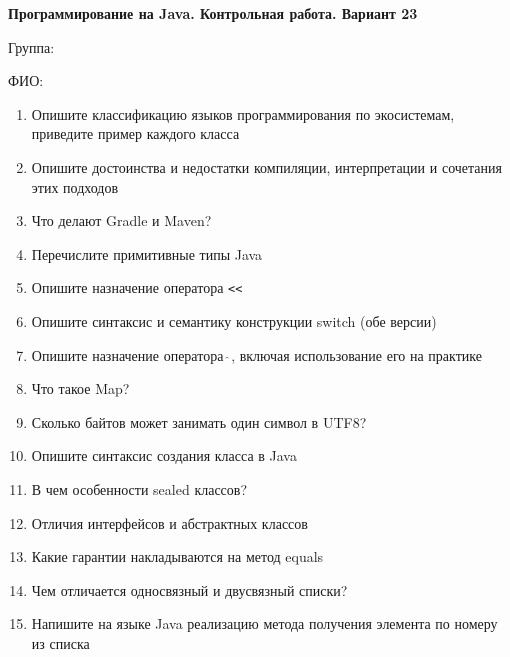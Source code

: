 \documentclass[12pt]{article}
\begin{document}
\newpage\begin{minipage}{\textwidth}
\textbf{Программирование на Java. Контрольная работа. Вариант 23}

Группа: \underline{\hspace{3cm}}

ФИО: \underline{\hspace{10cm}}

\begin{enumerate}
\item Опишите классификацию языков программирования по экосистемам, приведите пример каждого класса
\item Опишите достоинства и недостатки компиляции, интерпретации и сочетания этих подходов
\item Что делают Gradle и Maven?
\item Перечислите примитивные типы Java
\item Опишите назначение оператора \verb|<<|
\item Опишите синтаксис и семантику конструкции switch (обе версии)
\item Опишите назначение оператора $\hat{\ }$, включая использование его на практике
\item Что такое Map?
\item Сколько байтов может занимать один символ в UTF8?
\item Опишите синтаксис создания класса в Java
\item В чем особенности sealed классов?
\item Отличия интерфейсов и абстрактных классов
\item Какие гарантии накладываются на метод equals
\item Чем отличается односвязный и двусвязный списки?
\item Напишите на языке Java реализацию метода получения элемента по номеру из списка

\end{enumerate}
\end{minipage}

\newpage
\end{document}
